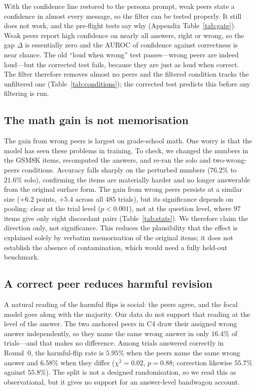 \documentclass[11pt]{article}
\begin{document}
With the confidence line restored to the persona prompt, weak peers state a
confidence in almost every message, so the filter can be tested properly.
It still does not work, and the pre-flight tests say why
(Appendix Table~\ref{tab:gate}).
Weak peers report high confidence on nearly all answers, right or wrong, so the
gap $\Delta$ is essentially zero and the AUROC of confidence against
correctness is near chance.
The old ``loud when wrong'' test passes---wrong peers are indeed loud---but the
corrected test fails, because they are just as loud when correct.
The filter therefore removes almost no peers and the filtered condition tracks
the unfiltered one (Table~\ref{tab:conditions}); the corrected test predicts
this before any filtering is run.


\subsection{The math gain is not memorisation}
\label{sub:contam}

The gain from wrong peers is largest on grade-school math.
One worry is that the model has seen these problems in training.
To check, we changed the numbers in the GSM8K items, recomputed the
answers, and re-ran the solo and two-wrong-peers conditions.
Accuracy falls sharply on the perturbed numbers ($76.2\%$ to $21.6\%$ solo),
confirming the items are materially harder and no longer answerable from the
original surface form.
The gain from wrong peers persists at a similar size ($+6.2$ points,
$+5.4$ across all $485$ trials), but its significance depends on pooling:
clear at the trial level ($p<0.001$), not at the question level, where $97$
items give only eight discordant pairs (Table~\ref{tab:stats}).
We therefore claim the direction only, not significance. This reduces the
plausibility that the effect is explained solely by verbatim memorisation of
the original items; it does not establish the absence of contamination, which
would need a fully held-out benchmark.

\subsection{A correct peer reduces harmful revision}
\label{sub:asch}

A natural reading of the harmful flips is social: the peers agree, and the focal
model goes along with the majority.
Our data do not support that reading at the level of the answer.
The two anchored peers in C4 draw their assigned wrong answer independently, so
they name the same wrong answer in only $16.4\%$ of trials---and that makes no
difference.
Among trials answered correctly in Round~0, the harmful-flip rate is $5.95\%$
when the peers name the same wrong answer and $6.58\%$ when they differ
($\chi^2 = 0.02$, $p = 0.88$; correction likewise $55.7\%$ against $55.8\%$).
The split is not a designed randomisation, so we read this as observational,
but it gives no support for an answer-level bandwagon account.
\end{document}
